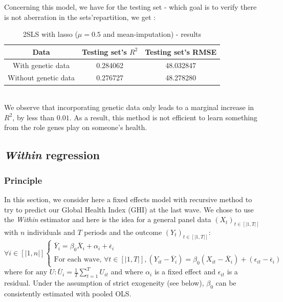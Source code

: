 \documentclass[]{article}
\begin{document}
\noindent
Concerning this model, we have for the testing set - which goal is to verify there is not aberration in the sets'repartition, we get : 
\begin{table}[!h]
	\centering
	\begin{tabular}{|c|c|c|}
		\hline
		\textbf{Data} & \textbf{Testing set's $R^2$} & \textbf{Testing set's RMSE} \\
		\hline
		With genetic data & 0.284062 & 48.032847  \\ 
		\hline
		Without genetic data & 0.276727 & 48.278280 \\
		\hline 
	\end{tabular}
	\caption{2SLS with lasso ($\mu = 0.5$ and mean-imputation) - results}
	\label{results_2SLS}
\end{table}\\
We observe that incorporating genetic data only leads to a marginal increase in $R^2$, by less than $0.01$. As a result, this method is not efficient to learn something from the role genes play on someone's health.

\subsection{\textit{Within} regression}

\subsubsection{Principle}

In this section, we consider here a fixed effects model with recursive method to try to predict our Global Health Index (GHI) at the last wave. We chose to use the \textit{Within} estimator and here is the idea for a general panel data $(X_t)_{t\in [|1,T|]}$ with $n$ individuals and $T$ periods and the outcome $(Y_t)_{t\in [|1,T|]}$:  
$$ \forall i \in [|1,n|] \left\{
    \begin{array}{ll}
        \overline{Y}_i = \beta_0 \overline{X}_i + \alpha_i + \overline{\epsilon}_i \\
        \text{For each wave, } \forall t \in [|1,T|] , (Y_{it} -\overline{Y}_i )= \beta_0 ( X_{it} - \overline{X}_i) + (\epsilon_{it} - \overline{\epsilon}_i )
    \end{array}
\right.$$ 
$ \text{where for any } U : \overline{U}_i = \frac{1}{T} \sum_{t=1}^T U_{it}$ and where $\alpha_i$ is a fixed effect and $\epsilon_{it}$ is a residual. Under the assumption of strict exogeneity (see below), $\beta_0$ can be consistently estimated with pooled OLS. \\
\end{document}
